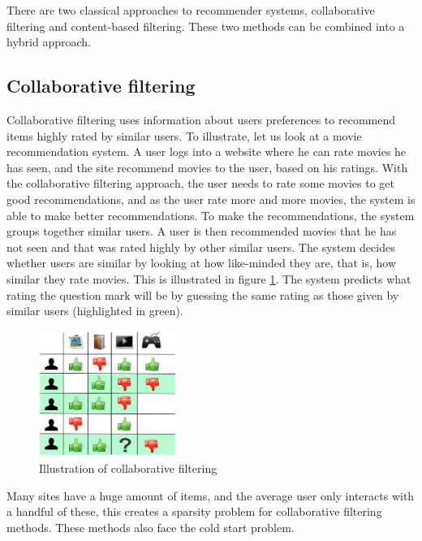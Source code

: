 There are two classical approaches to recommender systems, collaborative filtering and content-based filtering. These two methods can be combined into a hybrid approach.

\subsection{Collaborative filtering}
Collaborative filtering uses information about users preferences to recommend items highly rated by similar users. To illustrate, let us look at a movie recommendation system. A user logs into a website where he can rate movies he has seen, and the site recommend movies to the user, based on his ratings. With the collaborative filtering approach, the user needs to rate some movies to get good recommendations, and as the user rate more and more movies, the system is able to make better recommendations. To make the recommendations, the system groups together similar users. A user is then recommended movies that he has not seen and that was rated highly by other similar users. The system decides whether users are similar by looking at how like-minded they are, that is, how similar they rate movies. This is illustrated in figure \ref{fig:collaborative-filtering}. The system predicts what rating the question mark will be by guessing the same rating as those given by similar users (highlighted in green).\\

\begin{figure}[htp]
	\centering
	\includegraphics[width=0.4\textwidth]{fig/collab-filtering.png}
	\caption{Illustration of collaborative filtering}
	\label{fig:collaborative-filtering}
\end{figure}

Many sites have a huge amount of items, and the average user only interacts with a handful of these, this creates a sparsity problem for collaborative filtering methods. These methods also face the cold start problem.\\

